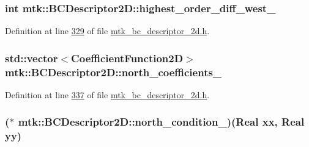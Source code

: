 \hypertarget{classmtk_1_1BCDescriptor2D_aa18ef62f8eda355e47f51bcb5dbe8fe7}{
\subsubsection[{highest\+\_\+order\+\_\+diff\+\_\+west\+\_\+}]{\setlength{\rightskip}{0pt plus 5cm}int mtk\+::\+B\+C\+Descriptor2\+D\+::highest\+\_\+order\+\_\+diff\+\_\+west\+\_\+\hspace{0.3cm}{\ttfamily [private]}}}\label{classmtk_1_1BCDescriptor2D_aa18ef62f8eda355e47f51bcb5dbe8fe7}


Definition at line \hyperlink{mtk__bc__descriptor__2d_8h_source_l00329}{329} of file \hyperlink{mtk__bc__descriptor__2d_8h_source}{mtk\+\_\+bc\+\_\+descriptor\+\_\+2d.\+h}.

\hypertarget{classmtk_1_1BCDescriptor2D_a5429c040c034303dd92dcff554f9efad}{
\subsubsection[{north\+\_\+coefficients\+\_\+}]{\setlength{\rightskip}{0pt plus 5cm}std\+::vector$<${\bf Coefficient\+Function2\+D}$>$ mtk\+::\+B\+C\+Descriptor2\+D\+::north\+\_\+coefficients\+\_\+\hspace{0.3cm}{\ttfamily [private]}}}\label{classmtk_1_1BCDescriptor2D_a5429c040c034303dd92dcff554f9efad}


Definition at line \hyperlink{mtk__bc__descriptor__2d_8h_source_l00337}{337} of file \hyperlink{mtk__bc__descriptor__2d_8h_source}{mtk\+\_\+bc\+\_\+descriptor\+\_\+2d.\+h}.

\hypertarget{classmtk_1_1BCDescriptor2D_a23e0b9ae755dcf81841aa24ddaf0b090}{
\subsubsection[{north\+\_\+condition\+\_\+}]{($\ast$ mtk\+::\+B\+C\+Descriptor2\+D\+::north\+\_\+condition\+\_\+)({\bf Real} xx, {\bf Real} yy)\hspace{0.3cm}{\ttfamily [private]}}}\label{classmtk_1_1BCDescriptor2D_a23e0b9ae755dcf81841aa24ddaf0b090}


